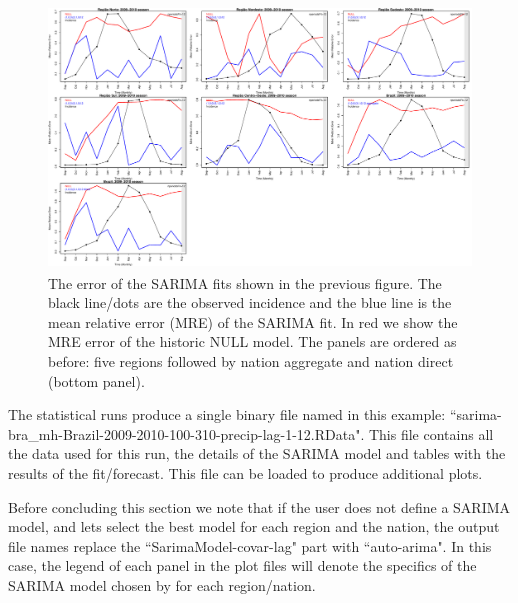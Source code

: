 \documentclass[a4paper]{article}
\begin{document}
\begin{figure}[htbp]
  \centering
  \includegraphics[height=2.75in,keepaspectratio]{figures/sarima_error.pdf}
  \hspace{0.4in}
  \caption{The error of the SARIMA fits shown in the previous figure. The black line/dots are the observed incidence and the blue line is the mean relative error (MRE) of the SARIMA fit.  In red we show the MRE error of the historic NULL model. The panels are ordered as before: five regions followed by nation aggregate and nation direct (bottom panel). }
  \label{fig:sarima_error}
\end{figure}

The statistical runs produce a single binary file named in this example: ``sarima-bra\_mh-Brazil-2009-2010-100-310-precip-lag-1-12.RData".  This file contains all the data used for this run, the details of the SARIMA model and tables with the results of the fit/forecast.   This file can be loaded to produce additional plots.

Before concluding this section we note that if the user does not define a SARIMA model, and lets  select the best model for each region and the nation, the output file names replace the ``SarimaModel-covar-lag" part with ``auto-arima". In this case, the legend of each panel in the plot files will denote the specifics of the SARIMA model chosen by  for each region/nation.
\end{document}

